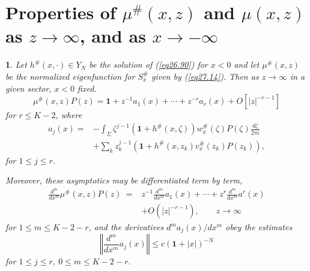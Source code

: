 \documentclass{surv-l}
\theoremstyle{plain}
\newtheorem{prop}[theorem]{\sc{Proposition}}
\theoremstyle{definition}
\numberwithin{equation}{chapter}
\begin{document}
\section{Properties of $\mu^{\#}(x, z)$ and $\mu(x, z)$ as $z\rightarrow\infty$, and as $ x\rightarrow-\infty$}\label{sec29}
\renewcommand\thetheorem{29.\arabic{theorem}}
\begin{prop}\label{eq29.1}
Let $h^{\#}(x, \cdot)\in Y_{N}$ be the solution of \emph{(\ref{eq26.90})} for $x<0$
and let $\mu^{\#}(x,z)$ be the normalized eigenfunction for
$S_{x}^{\#}$ given by \emph{(\ref{eq27.14})}. Then as $ z\rightarrow\infty$ in a given sector, $x<0$ fixed.
\setcounter{equation}{1}
\begin{equation}\label{eq29.2}
\mu^{\#}(x, z)P(z)=\mathbf{1}+z^{-1}a_{1}(x)+\cdots+z^{-r}a_{r}(x)+O[|z|^{-r-1}]
\end{equation}
for $r\leq K-2$, where
\begin{align}\label{eq29.3}
a_{j}(x)=&-\int_{\Sigma}\zeta^{j-1}(\mathbf{1}+h^{\#}(x, \zeta))w_{x}^{\#}(\zeta)P(\zeta)\frac{d{\zeta}}{2\pi i}\\
&+\sum_{k}z_{k}^{j-1}(\mathbf{1}+h^{\#}(x, z_{k})v_{x}^{\#}(z_{k})P(z_{k})),\nonumber
\end{align}
for $1\leq j\leq r$.

Moreover, these asymptotics may be differentiated term by term,
\begin{align}\label{eq29.4}
\frac{d^{m}}{dx^{m}}\mu^{\#}(x,z)P(z)\ =&z^{-1}\frac{d^{m}}{dx^{m}}a_{1}(x)+\cdots +z^{r}\frac{d^{m}}{dx^{m}}a^{r}(x)\\\nonumber
&+O(|z|^{-r-1}),\qquad z\rightarrow\infty
\end{align}
for $1\leq m\leq K-2-r$, and the derivatives $d^{m}a_{j}(x)/dx^{m}$ obey the estimates
\begin{equation}\label{eq29.5}
\left\Vert\frac{d^{m}}{dx^{m}}a_{j}(x)\right\Vert\leq c(\mathbf{1}+|x|)^{-N}
\end{equation}
for $1\leq j\leq r,\ 0\leq m\leq K-2-r$.
\end{prop}
\end{document}
